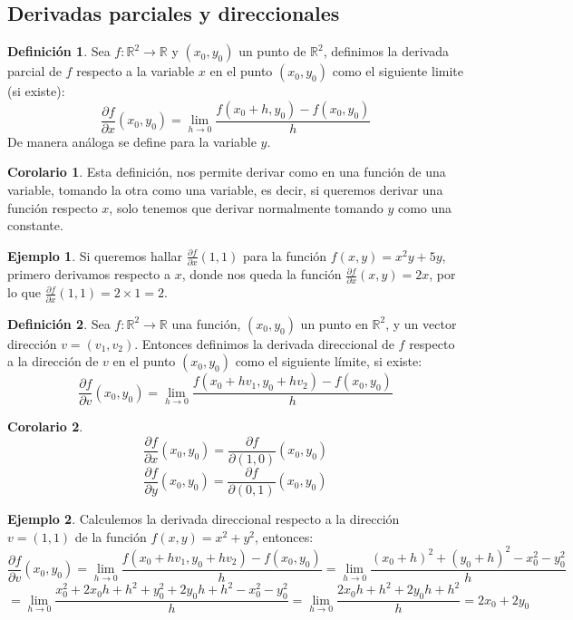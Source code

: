 \documentclass[10pt]{article}
\theoremstyle{definition}
\newtheorem{definition}{Definición}[section]
\newtheorem{corollary}{Corolario}[theorem]
\newtheorem{example}{Ejemplo}[section]
\begin{document}
\subsection{Derivadas parciales y direccionales}
\begin{definition}
    Sea $f:\mathbb{R}^2\to\mathbb{R}$ y $(x_0,y_0)$ un punto de $\mathbb{R}^2$, definimos la derivada parcial de $f$ respecto a la variable $x$ en el punto $(x_0,y_0)$ como el siguiente limite (si existe):$$\frac{\partial f}{\partial x}(x_0,y_0)=\lim_{h \to 0}\frac{f(x_0+h,y_0)-f(x_0,y_0)}{h}$$
    De manera análoga se define para la variable $y$.
\end{definition}
\begin{corollary}
    Esta definición, nos permite derivar como en una función de una variable, tomando la otra como una variable, es decir, si queremos derivar una función respecto $x$, solo tenemos que derivar normalmente tomando $y$ como una constante.
\end{corollary}
\begin{example}
    Si queremos hallar $\frac{\partial f}{\partial x}(1,1)$ para la función $f(x,y)=x^2y+5y$, primero derivamos respecto a $x$, donde nos queda la función $\frac{\partial f}{\partial x}(x,y)=2x$, por lo que $\frac{\partial f}{\partial x}(1,1)=2\times 1=2$.
\end{example}
\begin{definition}
    Sea $f:\mathbb{R}^2\to\mathbb{R}$ una función, $(x_0,y_0)$ un punto en $\mathbb{R}^2$, y un vector dirección $v=(v_1,v_2)$. Entonces definimos la derivada direccional de $f$ respecto a la dirección de $v$ en el punto $(x_0,y_0)$ como el siguiente límite, si existe:$$\frac{\partial f}{\partial v}(x_0,y_0)=\lim_{h \to 0}\frac{f(x_0+hv_1,y_0+hv_2)-f(x_0,y_0)}{h}$$
\end{definition}
\begin{corollary}
    $$\frac{\partial f}{\partial x}(x_0,y_0)=\frac{\partial f}{\partial (1,0)} (x_0,y_0)$$
    $$\frac{\partial f}{\partial y} (x_0,y_0)=\frac{\partial f}{\partial (0,1)} (x_0,y_0)$$
\end{corollary}
\begin{example}
    Calculemos la derivada direccional respecto a la dirección $v=(1,1)$ de la función $f(x,y)=x^2+y^2$, entonces:$$\frac{\partial f}{\partial v}(x_0,y_0)=\lim_{h \to 0}\frac{f(x_0+hv_1,y_0+hv_2)-f(x_0,y_0)}{h}=\lim_{h \to 0}\frac{(x_0+h)^2+(y_0+h)^2-x_0^2-y_0^2}{h}$$
    $$=\lim_{h \to 0}\frac{x_0^2+2x_0h+h^2+y_0^2+2y_0h+h^2-x_0^2-y_0^2}{h}=\lim_{h \to 0}\frac{2x_0h+h^2+2y_0h+h^2}{h}=2x_0+2y_0$$
\end{example}
\end{document}
